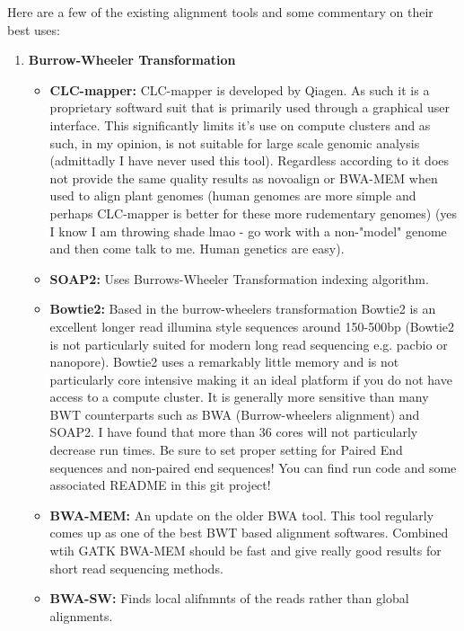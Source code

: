 \documentclass{article}
\begin{document}
    Here are a few of the existing alignment tools and some commentary on their best uses:
    \begin{enumerate}
            
        \item\textbf{Burrow-Wheeler Transformation}
        \begin{itemize}
            \item  \textbf{CLC-mapper:} CLC-mapper is developed by Qiagen.  As such it is a proprietary softward suit that is primarily used through a graphical user interface.   This significantly limits it's use on compute clusters and as such, in my opinion, is not suitable for large scale genomic analysis (admittadly I have never used this tool).  Regardless according to \cite{schilbertComparisonReadMapping2020} it does not provide the same quality results as novoalign or BWA-MEM when used to align plant genomes (human genomes are more simple and perhaps CLC-mapper is better for these more rudementary genomes) (yes I know I am throwing shade lmao - go work with a non-"model" genome and then come talk to me.  Human genetics are easy).

            \item \textbf{SOAP2:} Uses Burrows-Wheeler Transformation indexing algorithm. \cite{schilbertComparisonReadMapping2020} \cite{wuBenchmarkingVariantIdentification2019}
                
            \item \textbf{Bowtie2:} Based in the burrow-wheelers transformation Bowtie2 is an excellent longer read illumina style sequences around 150-500bp (Bowtie2 is not particularly suited for modern long read sequencing e.g. pacbio or nanopore).  Bowtie2 uses a remarkably little memory and is not particularly core intensive making it an ideal platform if you do not have access to a compute cluster.   It is generally more sensitive than many BWT counterparts such as BWA (Burrow-wheelers alignment) and SOAP2.  I have found that more than 36 cores will not particularly decrease run times.   Be sure to set proper setting for Paired End sequences and non-paired end sequences!  You can find run code and some associated README in this git project! \cite{langmeadFastGappedreadAlignment2012a} \cite{schilbertComparisonReadMapping2020}
                
            \item \textbf{BWA-MEM:} An update on the older BWA tool. This tool regularly comes up as one of the best BWT based alignment softwares.  Combined wtih GATK BWA-MEM should be fast and give really good results for short read sequencing methods.  
            \item \textbf{BWA-SW:} Finds local alifnmnts of the reads rather than global alignments.
                

\end{itemize}
\end{enumerate}
\end{document}
